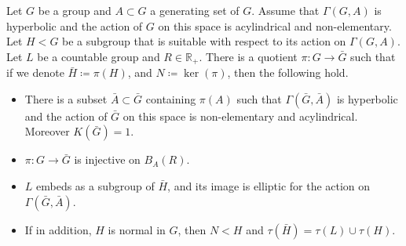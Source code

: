 \begin{proposition}
\label{res: quotient with prescribed torsion}
Let $G$ be a group and $A \subset G$ a generating set of $G$.
Assume that $\Gamma(G,A)$ is hyperbolic and the action of $G$ on this space is acylindrical and non-elementary.
Let $H < G$ be a subgroup that is suitable with respect to its action on $\Gamma(G,A)$.
Let $L$ be a countable group and $R \in \mathbb R_+$.
There is a quotient $\pi : G \to \bar G$ such that if we denote $\bar H \coloneqq \pi(H)$, and $N \coloneqq \ker(\pi)$, then the following hold.
\begin{itemize}
\item There is a subset $\bar A \subset \bar G$ containing $\pi(A)$ such that $\Gamma(\bar G, \bar A)$ is hyperbolic and the action of $\bar G$ on this space is non-elementary and acylindrical. Moreover $K(\bar G) = 1$.
\item $\pi : G \to \bar G$ is injective on $B_A(R)$.
\item $L$ embeds as a subgroup of $\bar H$, and its image is elliptic for the action on $\Gamma(\bar G, \bar A)$.
\item If in addition, $H$ is normal in $G$, then $N < H$ and $\tau(\bar H) = \tau(L) \cup \tau(H)$.
\end{itemize} 
\end{proposition}

